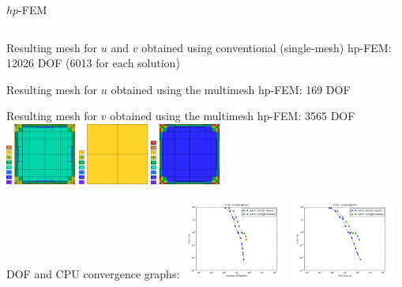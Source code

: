 \begin{frame}{$hp$-FEM}
\begin{columns}
\begin{column}{7cm}
    Resulting mesh for $ u $ and $ v $ obtained using conventional (single-mesh) hp-FEM: 12026 DOF (6013 for each solution)
    
    Resulting mesh for $ u $ obtained using the multimesh hp-FEM: 169 DOF
    
    Resulting mesh for $ v $ obtained using the multimesh hp-FEM: 3565 DOF
    \includegraphics[width=2.3cm]{figures/mesh_single}
    \includegraphics[width=2.3cm]{figures/mesh_multi_u}
    \includegraphics[width=2.3cm]{figures/mesh_multi_v}

    DOF and CPU convergence graphs:
    \includegraphics[width=3.5cm]{figures/conv_dof12}
    \includegraphics[width=3.5cm]{figures/conv_cpu12}
    
  \end{column}
  \end{columns}

\end{frame}
